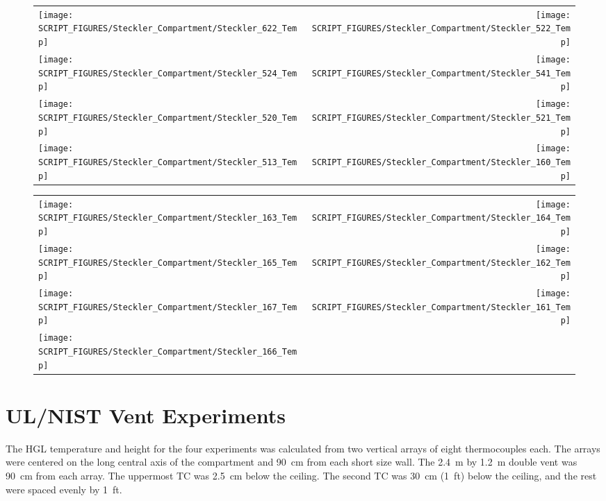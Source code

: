 \begin{figure}[p]
\begin{tabular*}{\textwidth}{l@{\extracolsep{\fill}}r}
\texttt{[image: SCRIPT\_FIGURES/Steckler\_Compartment/Steckler\_622\_Temp]} &
\texttt{[image: SCRIPT\_FIGURES/Steckler\_Compartment/Steckler\_522\_Temp]} \\
\texttt{[image: SCRIPT\_FIGURES/Steckler\_Compartment/Steckler\_524\_Temp]} &
\texttt{[image: SCRIPT\_FIGURES/Steckler\_Compartment/Steckler\_541\_Temp]} \\
\texttt{[image: SCRIPT\_FIGURES/Steckler\_Compartment/Steckler\_520\_Temp]} &
\texttt{[image: SCRIPT\_FIGURES/Steckler\_Compartment/Steckler\_521\_Temp]} \\
\texttt{[image: SCRIPT\_FIGURES/Steckler\_Compartment/Steckler\_513\_Temp]} &
\texttt{[image: SCRIPT\_FIGURES/Steckler\_Compartment/Steckler\_160\_Temp]}
\end{tabular*}
\label{Steckler_Temp_6}
\end{figure}

\begin{figure}[p]
\begin{tabular*}{\textwidth}{l@{\extracolsep{\fill}}r}
\texttt{[image: SCRIPT\_FIGURES/Steckler\_Compartment/Steckler\_163\_Temp]} &
\texttt{[image: SCRIPT\_FIGURES/Steckler\_Compartment/Steckler\_164\_Temp]} \\
\texttt{[image: SCRIPT\_FIGURES/Steckler\_Compartment/Steckler\_165\_Temp]} &
\texttt{[image: SCRIPT\_FIGURES/Steckler\_Compartment/Steckler\_162\_Temp]} \\
\texttt{[image: SCRIPT\_FIGURES/Steckler\_Compartment/Steckler\_167\_Temp]} &
\texttt{[image: SCRIPT\_FIGURES/Steckler\_Compartment/Steckler\_161\_Temp]} \\
\texttt{[image: SCRIPT\_FIGURES/Steckler\_Compartment/Steckler\_166\_Temp]} &
\end{tabular*}
\label{Steckler_Temp_7}
\end{figure}

\clearpage

\section{UL/NIST Vent Experiments}

The HGL temperature and height for the four experiments was calculated from two vertical arrays of eight thermocouples each. The arrays were centered on the long central axis of the compartment and 90~cm from each short size wall. The 2.4~m by 1.2~m double vent was 90~cm from each array. The uppermost TC was 2.5~cm below the ceiling. The second TC was 30~cm (1~ft) below the ceiling, and the rest were spaced evenly by 1~ft. 

